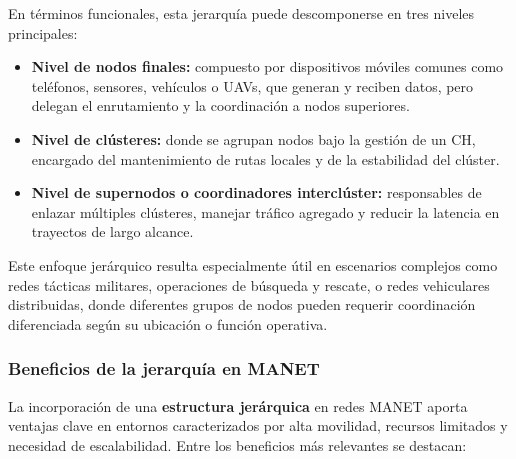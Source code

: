 \documentclass{article}
\begin{document}
En términos funcionales, esta jerarquía puede descomponerse en tres niveles principales:
\begin{itemize}
    \item \textbf{Nivel de nodos finales:} compuesto por dispositivos móviles comunes como teléfonos, sensores, vehículos o UAVs, que generan y reciben datos, pero delegan el enrutamiento y la coordinación a nodos superiores.
    \item \textbf{Nivel de clústeres:} donde se agrupan nodos bajo la gestión de un CH, encargado del mantenimiento de rutas locales y de la estabilidad del clúster.
    \item \textbf{Nivel de supernodos o coordinadores interclúster:} responsables de enlazar múltiples clústeres, manejar tráfico agregado y reducir la latencia en trayectos de largo alcance.
\end{itemize}

Este enfoque jerárquico resulta especialmente útil en escenarios complejos como redes tácticas militares, operaciones de búsqueda y rescate, o redes vehiculares distribuidas, donde diferentes grupos de nodos pueden requerir coordinación diferenciada según su ubicación o función operativa.


\subsubsection{Beneficios de la jerarquía en MANET}
La incorporación de una \textbf{estructura jerárquica} en redes MANET aporta ventajas clave en entornos caracterizados por alta movilidad, recursos limitados y necesidad de escalabilidad. Entre los beneficios más relevantes se destacan:
\end{document}
